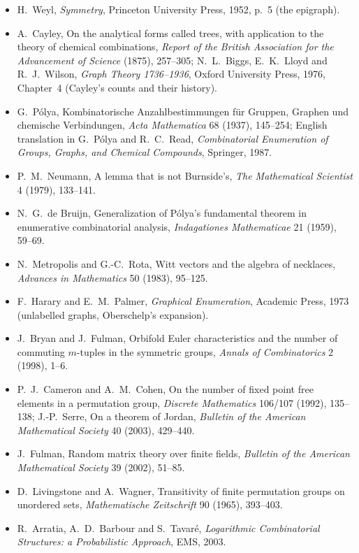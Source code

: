 \begin{itemize}
\item H.~Weyl, \emph{Symmetry}, Princeton University Press, 1952, p.~5 (the epigraph).
\item A.~Cayley, On the analytical forms called trees, with application to the theory of chemical combinations,
\emph{Report of the British Association for the Advancement of Science} (1875), 257--305; N.~L.~Biggs, E.~K.~Lloyd and
R.~J.~Wilson, \emph{Graph Theory 1736--1936}, Oxford University Press, 1976, Chapter~4 (Cayley's counts and their history).
\item G.~Pólya, Kombinatorische Anzahlbestimmungen für Gruppen, Graphen und chemische Verbindungen, \emph{Acta Mathematica} 68 (1937),
145--254; English translation in G.~Pólya and R.~C.~Read, \emph{Combinatorial Enumeration of Groups, Graphs, and Chemical
Compounds}, Springer, 1987.
\item P.~M.~Neumann, A lemma that is not Burnside's, \emph{The Mathematical Scientist} 4 (1979), 133--141.
\item N.~G.~de Bruijn, Generalization of Pólya's fundamental theorem in enumerative combinatorial analysis, \emph{Indagationes
Mathematicae} 21 (1959), 59--69.
\item N.~Metropolis and G.-C.~Rota, Witt vectors and the algebra of necklaces, \emph{Advances in Mathematics} 50 (1983), 95--125.
\item F.~Harary and E.~M.~Palmer, \emph{Graphical Enumeration}, Academic Press, 1973 (unlabelled graphs, Oberschelp's expansion).
\item J.~Bryan and J.~Fulman, Orbifold Euler characteristics and the number of commuting $m$-tuples in the symmetric groups,
\emph{Annals of Combinatorics} 2 (1998), 1--6.
\item P.~J.~Cameron and A.~M.~Cohen, On the number of fixed point free elements in a permutation group, \emph{Discrete
Mathematics} 106/107 (1992), 135--138; J.-P.~Serre, On a theorem of Jordan, \emph{Bulletin of the American Mathematical Society}
40 (2003), 429--440.
\item J.~Fulman, Random matrix theory over finite fields, \emph{Bulletin of the American Mathematical Society} 39 (2002), 51--85.
\item D.~Livingstone and A.~Wagner, Transitivity of finite permutation groups on unordered sets, \emph{Mathematische Zeitschrift}
90 (1965), 393--403.
\item R.~Arratia, A.~D.~Barbour and S.~Tavaré, \emph{Logarithmic Combinatorial Structures: a Probabilistic Approach}, EMS, 2003.

\end{itemize}
